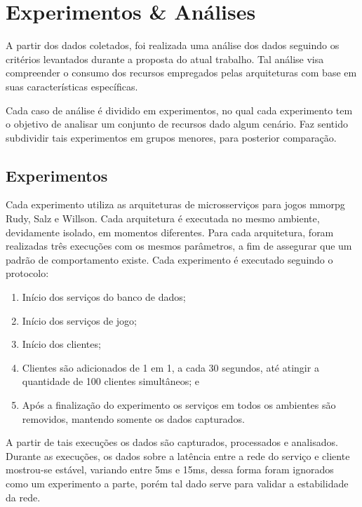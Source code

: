 \chapter{Experimentos \& Análises}
\label{cap6}



A partir dos dados coletados, foi realizada uma análise dos dados seguindo os critérios levantados durante a proposta do atual trabalho.
%
Tal análise visa compreender o consumo dos recursos empregados pelas arquiteturas com base em suas características específicas.



Cada caso de análise é dividido em experimentos, no qual cada experimento tem o objetivo de analisar um conjunto de recursos dado algum cenário.
%
Faz sentido subdividir tais experimentos em grupos menores, para posterior comparação.



\section{Experimentos}
\label{sec:experimentos}

Cada experimento utiliza as arquiteturas de microsserviços para jogos \ac{mmorpg} Rudy, Salz e Willson.
%
Cada arquitetura é executada no mesmo ambiente, devidamente isolado, em momentos diferentes.
%
Para cada arquitetura, foram realizadas três execuções com os mesmos parâmetros, a fim de assegurar que um padrão de comportamento existe.
%
Cada  experimento é executado seguindo o protocolo:


\begin{enumerate}
 \item Início dos serviços do banco de dados;
 \item Início dos serviços de jogo;
 \item Início dos clientes;
 \item Clientes são adicionados de 1 em 1, a cada 30 segundos, até atingir a quantidade de 100 clientes simultâneos; e
 \item Após a finalização do experimento os serviços em todos os ambientes são removidos, mantendo somente os dados capturados.
\end{enumerate}


A partir de tais execuções os dados são capturados, processados e analisados.
%
Durante as execuções, os dados sobre a latência entre a rede do serviço e cliente mostrou-se estável, variando entre 5ms e 15ms, dessa forma foram ignorados como um experimento a parte, porém tal dado serve para validar a estabilidade da rede.

